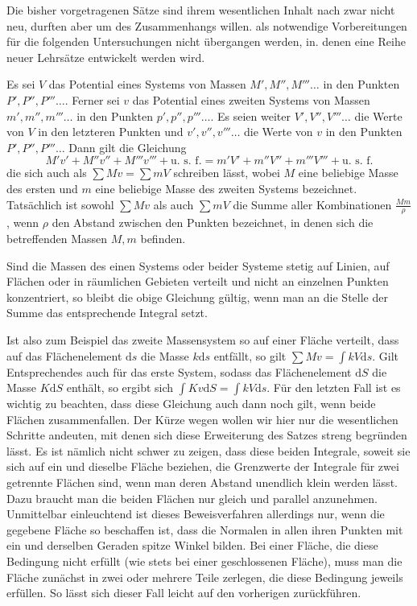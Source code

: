 %
Die bisher vorgetragenen Sätze sind ihrem wesentlichen Inhalt nach zwar nicht neu, durften aber um des Zusammenhangs willen. als notwendige Vorbereitungen für die folgenden Untersuchungen nicht übergangen werden, in. denen eine Reihe neuer Lehrsätze entwickelt werden wird.

Es sei $V$ das Potential eines Systems von Massen $M',M'',M'''\ldots$ in den Punkten $P',P'',P'''\ldots$. Ferner sei $v$ das Potential eines zweiten Systems von Massen $m',m'',m'''\ldots$ in den Punkten $p',p'',p'''\ldots$. Es seien weiter $V',V'',V'''\ldots$ die Werte von $V$ in den letzteren Punkten und $v',v'',v'''\ldots$ die Werte von $v$ in den Punkten $P',P'',P'''\ldots$ Dann gilt die Gleichung
\[
M'v'+M''v''+M'''v'''+\text{u. s. f.}=m'V'+m''V''+m'''V'''+\text{u. s. f.}
\]
die sich auch als $\sum Mv=\sum mV$ schreiben lässt, wobei $M$ eine beliebige Masse des ersten und $m$ eine beliebige Masse des zweiten Systems bezeichnet. Tatsächlich ist sowohl $\sum Mv$ als auch $\sum mV$ die Summe aller Kombinationen $\frac{Mm}{\rho}$, wenn $\rho$ den Abstand zwischen den Punkten bezeichnet, in denen sich die betreffenden Massen $M,m$ befinden.

Sind die Massen des einen Systems oder beider Systeme stetig auf Linien, auf Flächen oder in räumlichen Gebieten verteilt und nicht an einzelnen Punkten konzentriert, so bleibt die obige Gleichung gültig, wenn man an die Stelle der Summe das entsprechende Integral setzt.

Ist also zum Beispiel das zweite Massensystem so auf einer Fläche verteilt, dass auf das Flächenelement $\mathrm ds$ die Masse $k\mathrm ds$ entfällt, so gilt $\sum Mv=\int kV\mathrm ds$. Gilt Entsprechendes auch für das erste System, sodass das Flächenelement $\mathrm dS$ die Masse $K\mathrm dS$ enthält, so ergibt sich $\int Kv\mathrm dS=\int kV\mathrm ds$. Für den letzten Fall ist es wichtig zu beachten, dass diese Gleichung auch dann noch gilt, wenn beide Flächen zusammenfallen. Der Kürze wegen wollen wir hier nur die wesentlichen Schritte andeuten, mit denen sich diese Erweiterung des Satzes streng begründen lässt. Es ist nämlich nicht schwer zu zeigen, dass diese beiden Integrale, soweit sie sich auf ein und dieselbe Fläche beziehen, die Grenzwerte der Integrale für zwei getrennte Flächen
%
sind, wenn man deren Abstand unendlich klein werden lässt. Dazu braucht man die beiden Flächen nur gleich und parallel anzunehmen. Unmittelbar einleuchtend ist dieses Beweisverfahren allerdings nur, wenn die gegebene Fläche so beschaffen ist, dass die Normalen in allen ihren Punkten mit ein und derselben Geraden spitze Winkel bilden. Bei einer Fläche, die diese Bedingung nicht erfüllt (wie stets bei einer geschlossenen Fläche), muss man die Fläche zunächst in zwei oder mehrere Teile zerlegen, die diese Bedingung jeweils erfüllen. So lässt sich dieser Fall leicht auf den vorherigen zurückführen.

